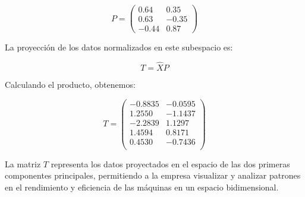 \documentclass[
  11pt,
  letterpaper,
   addpoints,
   answers
  ]{exam}
\begin{document}
\begin{questions}
\begin{solution}
 \[
 P = \begin{pmatrix} 0.64 & 0.35 \\ 0.63 & -0.35 \\ -0.44 & 0.87 \end{pmatrix}
 \]
 
 La proyección de los datos normalizados en este subespacio es:
 
 \[
 T = \hat{X} P
 \]
 
 Calculando el producto, obtenemos:
 
 \[
 T = \begin{pmatrix}
 -0.8835 & -0.0595 \\
 1.2550 & -1.1437 \\
 -2.2839 & 1.1297 \\
 1.4594 & 0.8171 \\
 0.4530 & -0.7436 \\
 \end{pmatrix}
 \]
 
 La matriz \( T \) representa los datos proyectados en el espacio de las dos primeras componentes principales, permitiendo a la empresa visualizar y analizar patrones en el rendimiento y eficiencia de las máquinas en un espacio bidimensional.
\end{solution}

\end{questions}
\end{document}
